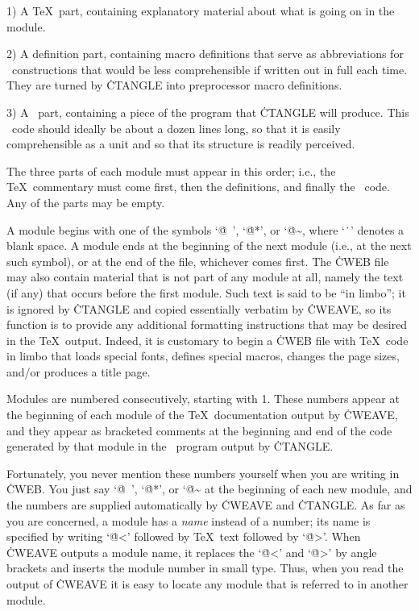 \yskip\item{1)} A \TeX\ part, containing explanatory material about what
is going on in the module.

\item{2)} A definition part, containing macro definitions that serve as
abbreviations for \Cee\ constructions that would be less comprehensible
if written out in full each time. They are turned by \.{CTANGLE} into
preprocessor macro definitions.

\item{3)} A \Cee\ part, containing a piece of the program that
\.{CTANGLE} will produce. This \Cee\ code should ideally be about a
dozen lines long, so that it is easily comprehensible as a unit and so
that its structure is readily perceived.

\yskip\noindent The three parts of each module must appear in this order;
i.e., the \TeX\ commentary must come first, then the definitions, and
finally the \Cee\ code. Any of the parts may be empty.

A module begins with one of the symbols `\.{@\ }', `\.{@*}', or `\.{@\~},
where `\.{\ }' denotes a blank space. A module ends
at the beginning of the next module (i.e., at the next such symbol),
or at the end of the file, whichever comes first.
The \.{CWEB} file may also contain material that is not part of any module
at all, namely the text (if any) that occurs before the first module.
Such text is said to be ``in limbo''; it is ignored by \.{CTANGLE}
and copied essentially verbatim by \.{CWEAVE}, so its function is to
provide any additional formatting instructions that may be desired in the
\TeX\ output. Indeed, it is customary to begin a \.{CWEB} file with
\TeX\ code in limbo that loads special fonts, defines special macros,
changes the page sizes, and/or produces a title page.

Modules are numbered consecutively, starting with 1. These numbers appear
at the beginning of each module of the \TeX\ documentation output by
\.{CWEAVE}, and they appear
as bracketed comments at the beginning and end of the code generated by that
module in the \Cee\ program output by \.{CTANGLE}.

Fortunately, you never mention these numbers yourself when you are writing
in \.{CWEB}. You just say `\.{@\ }', `\.{@*}', or `\.{@\~}
at the beginning of each
new module, and the numbers are supplied automatically by \.{CWEAVE} and
\.{CTANGLE}. As far as you are concerned, a module has a
{\sl name\/} instead of a number; its name is specified by writing
`\.{@<}' followed by \TeX\ text followed by `\.{@>}'. When \.{CWEAVE}
outputs a module name, it replaces the `\.{@<}' and `\.{@>}' by
angle brackets and inserts the module number in small type. Thus, when you
read the output of \.{CWEAVE} it is easy to locate any module that is
referred to in another module.

